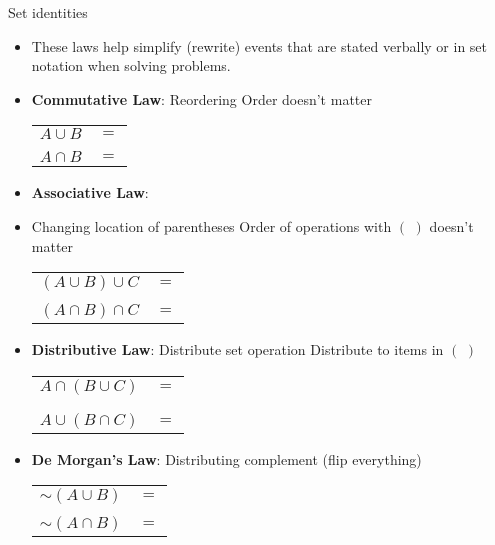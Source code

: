 \documentclass{article}
\newcommand{\comp}[1]{{\sim}#1}		%
\begin{document}
Set identities\bigskip
\begin{itemize}
    \item These laws help simplify (rewrite) events that are stated verbally or in set notation when solving problems.\bigskip
    \item \textbf{Commutative Law}: Reordering \hfill Order doesn't matter\bigskip\\
    \begin{tabular}{r l}
        $A \cup B$ & $=$ \\\\
        $A \cap B$ & $=$ \\
     \end{tabular}\bigskip
    \item \textbf{Associative Law}: 
    \item[] Changing location of parentheses \hfill Order of operations with $( \,\, )$ doesn't matter\bigskip\\
    \begin{tabular}{r l}
        $(A \cup B) \cup C$ & $=$ \\\\
        $(A \cap B) \cap C$ & $=$ \\
     \end{tabular}\bigskip
    \item \textbf{Distributive Law}: Distribute set operation \hfill Distribute to items in  $( \,\, )$\bigskip\bigskip\\
    \begin{tabular}{r l}
        $A \cap (B \cup C)$ & $=$ \\\\\\
        $A \cup (B \cap C)$ & $=$ \\
     \end{tabular}\bigskip
    \item \textbf{De Morgan's Law}: Distributing complement (flip everything)\bigskip\\
        \begin{tabular}{r l}
            $\comp{(A \cup B)}$ & $=$ \\\\
            $\comp{(A \cap B)}$ & $=$ \\
     \end{tabular}\bigskip
\end{itemize}\bigskip
\end{document}
